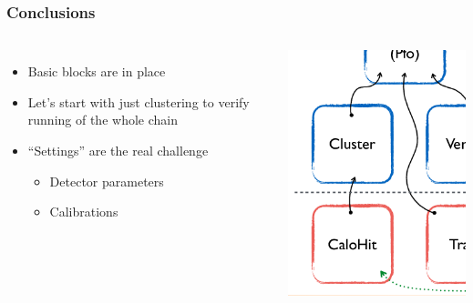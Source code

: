 \documentclass[aspectratio=169]{beamer}
\newcommand{\backupbegin}{
   \newcounter{finalframe}
   \setcounter{finalframe}{\value{framenumber}}
}
\newcommand{\backupend}{
   \setcounter{framenumber}{\value{finalframe}}
}
\newcommand{\redtext}[1]{%
  \textcolor{myRed}{#1}
}
\begin{document}
\begin{frame}
  \frametitle{Conclusions}

  \begin{columns}[c]

    \begin{itemize}
      \item Basic blocks are in place
      \item Let's start with just clustering to verify running of the whole chain
      \item ``Settings{}'' are the real challenge
            \begin{itemize}
              \item Detector parameters
              \item Calibrations
            \end{itemize}
    \end{itemize}


    \begin{center}
      \includegraphics[width=.8\textwidth]{figures/pandora_edm_cut.png}
    \end{center}
  \end{columns}
\end{frame}



%
%
%
%
%
\end{document}
